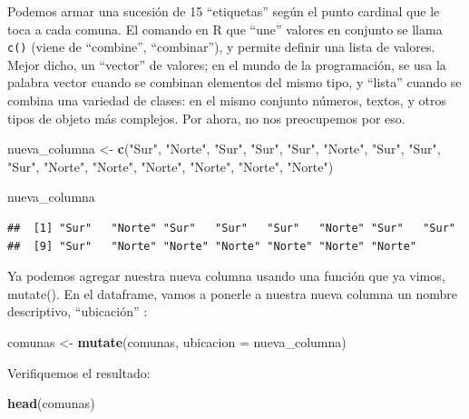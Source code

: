 \documentclass[]{book}
\newenvironment{Shaded}{\begin{snugshade}}{\end{snugshade}}
\newcommand{\KeywordTok}[1]{\textcolor[rgb]{0.13,0.29,0.53}{\textbf{#1}}}
\newcommand{\DataTypeTok}[1]{\textcolor[rgb]{0.13,0.29,0.53}{#1}}
\newcommand{\StringTok}[1]{\textcolor[rgb]{0.31,0.60,0.02}{#1}}
\newcommand{\NormalTok}[1]{#1}
\begin{document}
Podemos armar una sucesión de 15 ``etiquetas'' según el punto cardinal
que le toca a cada comuna. El comando en R que ``une'' valores en
conjunto se llama \texttt{c()} (viene de ``combine'', ``combinar''), y
permite definir una lista de valores. Mejor dicho, un ``vector'' de
valores; en el mundo de la programación, se usa la palabra vector cuando
se combinan elementos del mismo tipo, y ``lista'' cuando se combina una
variedad de clases: en el mismo conjunto números, textos, y otros tipos
de objeto más complejos. Por ahora, no nos preocupemos por eso.

\begin{Shaded}
\begin{Highlighting}[]
\NormalTok{nueva_columna <-}\StringTok{ }\KeywordTok{c}\NormalTok{(}\StringTok{"Sur"}\NormalTok{, }\StringTok{"Norte"}\NormalTok{, }\StringTok{"Sur"}\NormalTok{, }\StringTok{"Sur"}\NormalTok{, }\StringTok{"Sur"}\NormalTok{, }\StringTok{"Norte"}\NormalTok{, }\StringTok{"Sur"}\NormalTok{, }\StringTok{"Sur"}\NormalTok{, }\StringTok{"Sur"}\NormalTok{, }\StringTok{"Norte"}\NormalTok{, }\StringTok{"Norte"}\NormalTok{, }\StringTok{"Norte"}\NormalTok{, }\StringTok{"Norte"}\NormalTok{, }\StringTok{"Norte"}\NormalTok{, }\StringTok{"Norte"}\NormalTok{)}

\NormalTok{nueva_columna}
\end{Highlighting}
\end{Shaded}

\begin{verbatim}
##  [1] "Sur"   "Norte" "Sur"   "Sur"   "Sur"   "Norte" "Sur"   "Sur"  
##  [9] "Sur"   "Norte" "Norte" "Norte" "Norte" "Norte" "Norte"
\end{verbatim}

Ya podemos agregar nuestra nueva columna usando una función que ya
vimos, mutate(). En el dataframe, vamos a ponerle a nuestra nueva
columna un nombre descriptivo, ``ubicación'' :

\begin{Shaded}
\begin{Highlighting}[]
\NormalTok{comunas <-}\StringTok{ }\KeywordTok{mutate}\NormalTok{(comunas, }\DataTypeTok{ubicacion =}\NormalTok{ nueva_columna)}
\end{Highlighting}
\end{Shaded}

Verifiquemos el resultado:

\begin{Shaded}
\begin{Highlighting}[]
\KeywordTok{head}\NormalTok{(comunas)}
\end{Highlighting}
\end{Shaded}
\end{document}
